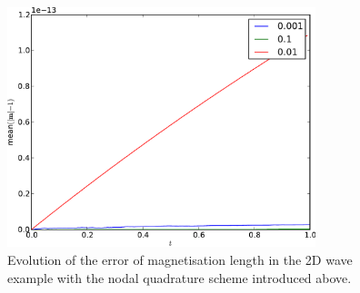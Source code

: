 \begin{figure}[ht!]
  \centering
  \includegraphics[width=0.8\textwidth]{plots/2d_wave_solution_m_length/lnodal-meanmathbfm-1vst.pdf}
  \caption{Evolution of the error of magnetisation length in the 2D wave example with the nodal quadrature scheme introduced above.}
  \label{fig:mean-ml-error-2d-nodal}
\end{figure}




